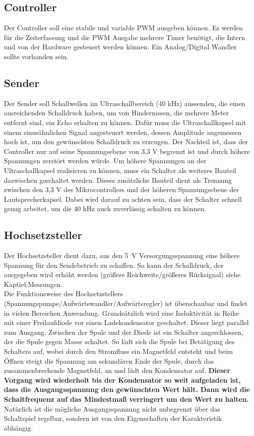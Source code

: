 \subsection{Controller}
Der Controller soll eine stabile und variable PWM ausgeben können. Es werden für die Zeiterfassung und die PWM Ausgabe mehrere Timer benötigt, die Intern und von der Hardware gesteuert werden können. Ein Analog/Digital Wandler sollte vorhanden sein.

\subsection{Sender}
Der Sender soll Schallwellen im Ultraschallbereich (40 kHz) aussenden, die einen ausreichenden Schalldruck haben, um von Hindernissen, die mehrere Meter entfernt sind, ein Echo erhalten zu können.
Dafür muss die Ultraschallkapsel mit einem sinusähnlichen Signal angesteuert werden, dessen Amplitude angemessen hoch ist, um den gewünschten Schalldruck zu erzeugen. Der Nachteil ist, dass der Controller nur auf seine Spannungsebene von 3,3 V begrenzt ist und durch höhere Spannungen zerstört werden würde.
Um höhere Spannungen an der Ultraschallkapsel realisieren zu können, muss ein Schalter als weiteres Bauteil dazwischen geschaltet werden. Dieses zusätzliche Bauteil dient als Trennung zwischen den 3,3 V des Mikrocontrollers und der höheren Spannungsebene der Lautsprecherkapsel. Dabei wird darauf zu achten sein, dass der Schalter schnell genug arbeitet, um die 40 kHz auch zuverlässig schalten zu können.

\subsection{Hochsetzsteller}
Der Hochsetzsteller dient dazu, aus den 5~V Versorgungsspannung eine höhere Spannung für den Sendebetrieb zu schaffen. So kann der Schalldruck, der ausgegeben wird erhöht werden (größere Reichweite/größeres Rücksignal) siehe Kaptiel:Messungen.\\%
Die Funktionsweise des Hochsetzstellers (Spannungspumpe/Aufwärtswandler/Aufwärtsregler) ist überschaubar und findet in vielen Bereichen Anwendung. Grundsätzlich wird eine Induktivität in Reihe mit einer Freilaufdiode vor einen Ladekondensator geschaltet. Dieser liegt parallel zum Ausgang. Zwischen der Spule und der Diode ist ein Schalter angeschlossen, der die Spule gegen Masse schaltet. So lädt sich die Spule bei Betätigung des Schalters auf, wobei durch den Stromfluss ein Magnetfeld entsteht und beim Öffnen steigt die Spannung am sekundären Ende der Spule, durch das zusammenbrechende Magnetfeld, an und lädt den Kondensator auf. \textbf{Dieser Vorgang wird wiederholt bis der Kondensator so weit aufgeladen ist, dass die Ausgangsspannung den gewünschten Wert hält. Dann wird die Schaltfrequenz auf das Mindestmaß verringert um den Wert zu halten.} Natürlich ist die mögliche Ausgangsspannung nicht unbegrenzt über das Schaltspiel regelbar, sondern ist von den Eigenschaften der Karakteristik abhängig. 
